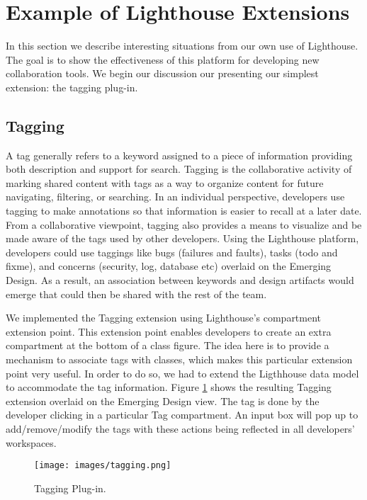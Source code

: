 \documentclass[10pt, conference, compsocconf]{IEEEtran}
\begin{document}
\section{Example of Lighthouse Extensions}

In this section we describe interesting situations from our own use of Lighthouse. The goal is to show the effectiveness of this platform for developing new collaboration tools. We begin our discussion our presenting our simplest extension: the tagging plug-in.

\subsection{Tagging}

A tag generally refers to a keyword assigned to a piece of information providing both description and support for search. Tagging is the collaborative activity of marking shared content with tags as a way to organize content for future navigating, filtering, or searching. In an individual perspective, developers use tagging to make annotations so that information is easier to recall at a later date. From a collaborative viewpoint, tagging also provides a means to visualize and be made aware of the tags used by other developers. Using the Lighthouse platform, developers could use taggings like bugs (failures and faults), tasks (todo and fixme), and concerns (security, log, database etc) overlaid on the Emerging Design. As a result, an association between keywords and design artifacts would emerge that could then be shared with the rest of the team.

We implemented the Tagging extension using Lighthouse's compartment extension point.  This extension point enables developers to create an extra compartment at the bottom of a class figure. The idea here is to provide a mechanism to associate tags with classes, which makes this particular extension point very useful.  In order to do so, we had to extend the Ligthhouse data model to accommodate the tag information.  Figure \ref{fig:tagging} shows the resulting Tagging extension overlaid on the Emerging Design view.  The tag is done by the developer clicking in a particular Tag compartment. An input box will pop up to add/remove/modify the tags with these actions being reflected in all developers' workspaces. 

\begin{figure}[!t]
	\centering
		\texttt{[image: images/tagging.png]}
	\caption{Tagging Plug-in.}
	\label{fig:tagging}
\end{figure}
\end{document}
